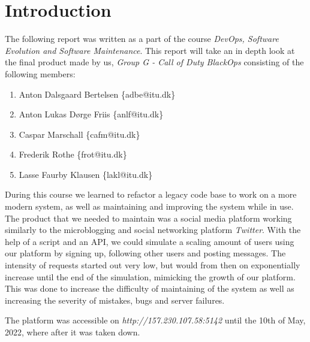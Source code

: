 \newpage
\section{Introduction}
\label{sec:mpt}

The following report was written as a part of the course \textit{DevOps, Software Evolution and Software Maintenance}. This report will take an in depth look at the final product made by us,  \textit{Group G - Call of Duty BlackOps} consisting of the following members: 
\begin{enumerate}
    \item Anton Dalsgaard Bertelsen \{adbe@itu.dk\}
    \item Anton Lukas Dørge Friis
    \{anlf@itu.dk\}
    \item Caspar Marschall
    \{cafm@itu.dk\}
    \item Frederik Rothe
    \{frot@itu.dk\}
    \item Lasse Faurby Klausen
    \{lakl@itu.dk\}
\end{enumerate}

During this course we learned to refactor a legacy code base to work on a more modern system, as well as maintaining and improving the system while in use. The product that we needed to maintain was a social media platform working similarly to the microblogging and social networking platform \textit{Twitter}. With the help of a script and an API, we could simulate a scaling amount of users using our platform by signing up, following other users and posting messages. The intensity of requests started out very low, but would from then on exponentially increase until the end of the simulation, mimicking the growth of our platform. This was done to increase the difficulty of maintaining of the system as well as increasing the severity of mistakes, bugs and server failures. 

The platform was accessible on \textit{http://157.230.107.58:5142} until the 10th of May, 2022, where after it was taken down. 